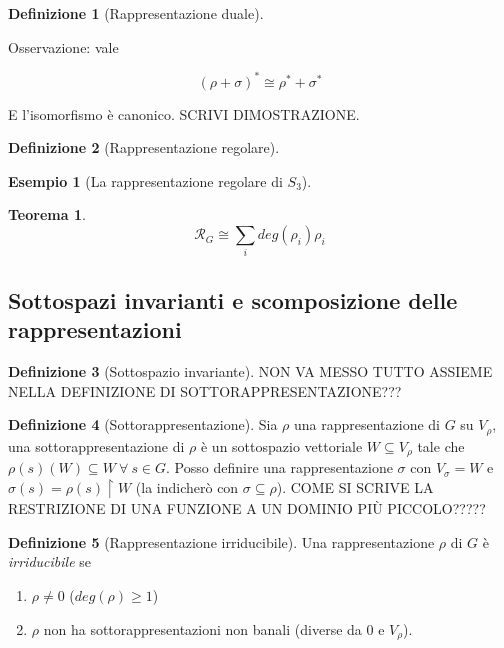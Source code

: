 \documentclass[11pt]{article}
\theoremstyle{plain}
\newtheorem{thm}{Teorema}[section]
\theoremstyle{definition}
\newtheorem{defn}{Definizione}[section]
\newtheorem{exmp}{Esempio}[section]
\theoremstyle{remark}
\newcommand{\dsum}{\displaystyle\sum}
\begin{document}
\begin{defn}[Rappresentazione duale]

\label{defn:rappresentazione duale}
\end{defn}

Osservazione: vale

\[ (\rho + \sigma)^* \cong \rho^* + \sigma^* \]

E l'isomorfismo è canonico. SCRIVI DIMOSTRAZIONE.





\begin{defn}[Rappresentazione regolare]

\label{defn:rappresentazione regolare}
\end{defn}

\begin{exmp}[La rappresentazione regolare di $S_3$]


\end{exmp}


\begin{thm}

\[\mathcal{R}_G \cong \dsum_i deg(\rho_i) \rho_i \]

\end{thm}



\subsection{Sottospazi invarianti e scomposizione delle rappresentazioni}


\begin{defn}[Sottospazio invariante]
NON VA MESSO TUTTO ASSIEME NELLA DEFINIZIONE DI SOTTORAPPRESENTAZIONE???

\end{defn}

\begin{defn}[Sottorappresentazione]
Sia $\rho$ una rappresentazione di $G$ su $V_{\rho}$, una sottorappresentazione di $\rho$ è un sottospazio vettoriale $W\subseteq V_{\rho}$ tale che $\rho(s)(W)\subseteq W\ \forall\ s\in G$. Posso definire una rappresentazione $\sigma$ con $V_{\sigma}=W$ e $\sigma(s)=\rho(s)\restriction W$ (la indicherò con $\sigma\subseteq \rho$).
COME SI SCRIVE LA RESTRIZIONE DI UNA FUNZIONE A UN DOMINIO PIÙ PICCOLO?????

\end{defn}



\begin{defn}[Rappresentazione irriducibile]
Una rappresentazione $\rho$ di $G$ è \textit{irriducibile} se
\begin{enumerate}
	\item $\rho \neq 0$ ($deg(\rho) \geq 1$)
	\item $\rho$ non ha sottorappresentazioni non banali (diverse da 0 e $V_{\rho}$).
\end{enumerate}

\end{defn}
\end{document}
